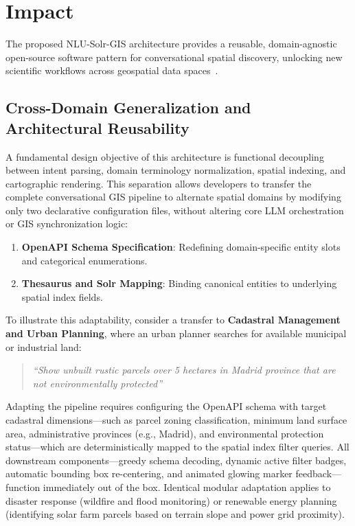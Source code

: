 \section{Impact}
\label{sec:Impact}

The proposed NLU-Solr-GIS architecture provides a reusable, domain-agnostic open-source software pattern for conversational spatial discovery, unlocking new scientific workflows across geospatial data spaces~\cite{softwarex2015}.

\subsection{Cross-Domain Generalization and Architectural Reusability}
\label{subsec:CrossDomain}

A fundamental design objective of this architecture is functional decoupling between intent parsing, domain terminology normalization, spatial indexing, and cartographic rendering. This separation allows developers to transfer the complete conversational GIS pipeline to alternate spatial domains by modifying only two declarative configuration files, without altering core LLM orchestration or GIS synchronization logic:
\begin{enumerate}
    \item \textbf{OpenAPI Schema Specification}: Redefining domain-specific entity slots and categorical enumerations.
    \item \textbf{Thesaurus and Solr Mapping}: Binding canonical entities to underlying spatial index fields.
\end{enumerate}

To illustrate this adaptability, consider a transfer to \textbf{Cadastral Management and Urban Planning}, where an urban planner searches for available municipal or industrial land:
\begin{quote}
\textit{``Show unbuilt rustic parcels over 5 hectares in Madrid province that are not environmentally protected''}
\end{quote}
Adapting the pipeline requires configuring the OpenAPI schema with target cadastral dimensions—such as parcel zoning classification, minimum land surface area, administrative provinces (e.g., Madrid), and environmental protection status—which are deterministically mapped to the spatial index filter queries. All downstream components—greedy schema decoding, dynamic active filter badges, automatic bounding box re-centering, and animated glowing marker feedback—function immediately out of the box. Identical modular adaptation applies to disaster response (wildfire and flood monitoring) or renewable energy planning (identifying solar farm parcels based on terrain slope and power grid proximity).

